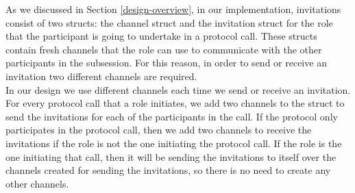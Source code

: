 \documentclass[12pt,twoside]{report}
\begin{document}
As we discussed in Section \ref{design-overview}, in our implementation, invitations consist of two structs: the channel struct and the invitation struct for the role that the participant is going to undertake in a protocol call. These structs contain fresh channels that the role can use to communicate with the other participants in the subsession. For this reason, in order to send or receive an invitation two different channels are required.\\

In our design we use different channels each time we send or receive an invitation. For every protocol call that a role initiates, we add two channels to the struct to send the invitations for each of the participants in the call. If the protocol only participates in the protocol call, then we add two channels to receive the invitations if the role is not the one initiating the protocol call. If the role is the one initiating that call, then it will be sending the invitations to itself over the channels created for sending the invitations, so there is no need to create any other channels.\\
\end{document}
